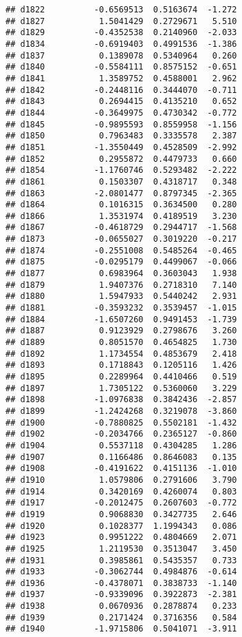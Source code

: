 \documentclass[
]{article}
\begin{document}
\begin{verbatim}
## d1822          -0.6569513  0.5163674  -1.272
## d1827           1.5041429  0.2729671   5.510
## d1829          -0.4352538  0.2140960  -2.033
## d1834          -0.6919403  0.4991536  -1.386
## d1837           0.1389078  0.5340964   0.260
## d1840          -0.5584111  0.8575152  -0.651
## d1841           1.3589752  0.4588001   2.962
## d1842          -0.2448116  0.3444070  -0.711
## d1843           0.2694415  0.4135210   0.652
## d1844          -0.3649975  0.4730342  -0.772
## d1845          -0.9895593  0.8559958  -1.156
## d1850           0.7963483  0.3335578   2.387
## d1851          -1.3550449  0.4528509  -2.992
## d1852           0.2955872  0.4479733   0.660
## d1854          -1.1760746  0.5293482  -2.222
## d1861           0.1503307  0.4318717   0.348
## d1863          -2.0801477  0.8797345  -2.365
## d1864           0.1016315  0.3634500   0.280
## d1866           1.3531974  0.4189519   3.230
## d1867          -0.4618729  0.2944717  -1.568
## d1873          -0.0655027  0.3019220  -0.217
## d1874          -0.2551008  0.5485264  -0.465
## d1875          -0.0295179  0.4499067  -0.066
## d1877           0.6983964  0.3603043   1.938
## d1879           1.9407376  0.2718310   7.140
## d1880           1.5947933  0.5440242   2.931
## d1881          -0.3593232  0.3539457  -1.015
## d1884          -1.6507260  0.9491453  -1.739
## d1887           0.9123929  0.2798676   3.260
## d1889           0.8051570  0.4654825   1.730
## d1892           1.1734554  0.4853679   2.418
## d1893           0.1718843  0.1205116   1.426
## d1895           0.2289964  0.4410466   0.519
## d1897           1.7305122  0.5360060   3.229
## d1898          -1.0976838  0.3842436  -2.857
## d1899          -1.2424268  0.3219078  -3.860
## d1900          -0.7880825  0.5502181  -1.432
## d1902          -0.2034766  0.2365127  -0.860
## d1904           0.5537118  0.4304285   1.286
## d1907           0.1166486  0.8646083   0.135
## d1908          -0.4191622  0.4151136  -1.010
## d1910           1.0579806  0.2791606   3.790
## d1914           0.3420169  0.4260074   0.803
## d1917          -0.2012475  0.2607603  -0.772
## d1919           0.9068830  0.3427735   2.646
## d1920           0.1028377  1.1994343   0.086
## d1923           0.9951222  0.4804669   2.071
## d1925           1.2119530  0.3513047   3.450
## d1931           0.3985861  0.5435357   0.733
## d1933          -0.3062744  0.4984876  -0.614
## d1936          -0.4378071  0.3838733  -1.140
## d1937          -0.9339096  0.3922873  -2.381
## d1938           0.0670936  0.2878874   0.233
## d1939           0.2171424  0.3716356   0.584
## d1940          -1.9715806  0.5041071  -3.911

\end{verbatim}
\end{document}
